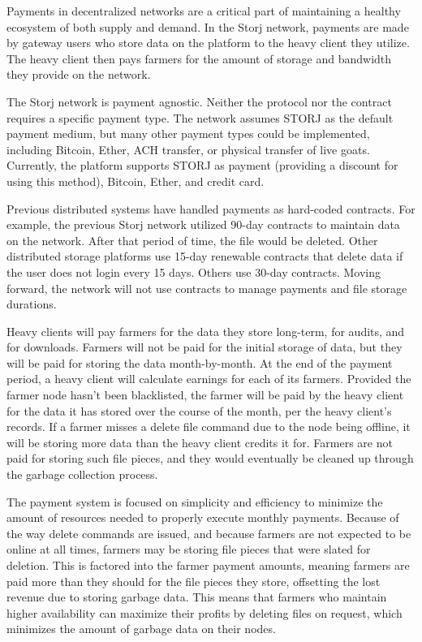 \documentclass[a4paper,10pt]{article} \usepackage[utf8]{inputenc}
\begin{document}
Payments in decentralized networks are a critical part of maintaining a healthy
ecosystem of both supply and demand.
In the Storj network, payments are made by gateway users who store data on the
platform to the heavy client they utilize.
The heavy client then pays farmers for the amount of storage and bandwidth they
provide on the network.

The Storj network is payment agnostic.
Neither the protocol nor the contract requires a specific payment type.
The network assumes STORJ as the default payment medium, but many other payment
types could be implemented, including Bitcoin, Ether, ACH transfer, or physical
transfer of live goats.
Currently, the platform supports STORJ as payment (providing a discount for
using this method), Bitcoin, Ether, and credit card.

Previous distributed systems have handled payments as hard-coded contracts.
For example, the previous Storj network utilized 90-day contracts to maintain
data on the network. After that period of time, the file would be deleted.
Other distributed storage platforms use 15-day renewable contracts that delete
data if the user does not login every 15 days. Others use 30-day contracts.
Moving forward, the network will not use contracts to manage payments and file
storage durations.

Heavy clients will pay farmers for the data they store long-term, 
for audits, and for downloads. 
Farmers will not be paid for the initial storage of data, but they
will be paid for storing the data month-by-month. At the end of the payment
period, a heavy client will calculate earnings for each of its farmers. 
Provided the farmer node hasn’t been blacklisted, 
the farmer will be paid by the heavy
client for the data it has stored over the course of
the month, per the heavy client's records. 
If a farmer misses a delete file command due to the node being
offline, it will be storing more data than the heavy client credits it for. 
Farmers are not paid for storing such file pieces, and they
would eventually be cleaned up through the garbage collection process.

The payment system is focused on simplicity and efficiency to minimize the
amount of resources needed to properly execute monthly payments. Because of the
way delete commands are issued, and because farmers are not expected to be
online at all times, farmers may be storing file pieces that were slated for
deletion. This is factored into
the farmer payment amounts, meaning farmers are paid more than they
should for the file pieces they store, offsetting the lost revenue due to
storing garbage data. 
This means that farmers who maintain higher availability
can maximize their profits by deleting files on request,
which minimizes the amount
of garbage data on their nodes.
\end{document}
